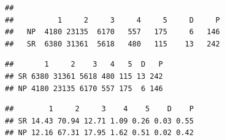 \begin{verbatim}
##     
##          1     2     3     4     5     D     P
##   NP  4180 23135  6170   557   175     6   146
##   SR  6380 31361  5618   480   115    13   242
\end{verbatim}

\begin{Shaded}
\begin{Highlighting}[]
\StringTok{ }\NormalTok{t[}\NormalTok{, ]}
\StringTok{ }\NormalTok{t[}\NormalTok{, ]}
\StringTok{ }
\StringTok{ }\NormalTok{(}\NormalTok{, }\NormalTok{)}
\StringTok{ }\NormalTok{(} \NormalTok{) *}\StringTok{ }\NormalTok{, }\NormalTok{)}
\end{Highlighting}
\end{Shaded}

\begin{verbatim}
##       1     2    3   4   5  D   P
## SR 6380 31361 5618 480 115 13 242
## NP 4180 23135 6170 557 175  6 146
\end{verbatim}

\begin{Shaded}
\begin{Highlighting}[]
\end{Highlighting}
\end{Shaded}

\begin{verbatim}
##        1     2     3    4    5    D    P
## SR 14.43 70.94 12.71 1.09 0.26 0.03 0.55
## NP 12.16 67.31 17.95 1.62 0.51 0.02 0.42
\end{verbatim}

\begin{Shaded}
\begin{Highlighting}[]
 \NormalTok{, } \NormalTok{, } \NormalTok{, }
     \NormalTok{)}
\NormalTok{(}\NormalTok{, } \NormalTok{(}\NormalTok{, }\NormalTok{), } \NormalTok{, } \NormalTok{(}\NormalTok{, }
    \NormalTok{))}
\end{Highlighting}
\end{Shaded}

